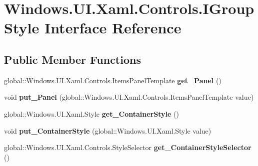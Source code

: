 \hypertarget{interface_windows_1_1_u_i_1_1_xaml_1_1_controls_1_1_i_group_style}{}\section{Windows.\+U\+I.\+Xaml.\+Controls.\+I\+Group\+Style Interface Reference}
\label{interface_windows_1_1_u_i_1_1_xaml_1_1_controls_1_1_i_group_style}
\subsection*{Public Member Functions}
\begin{DoxyCompactItemize}
\item 
\mbox{\label{interface_windows_1_1_u_i_1_1_xaml_1_1_controls_1_1_i_group_style_a0c9c3cde89c2eb82c05931ac6a601a16}} 
global\+::\+Windows.\+U\+I.\+Xaml.\+Controls.\+Items\+Panel\+Template {\bfseries get\+\_\+\+Panel} ()
\item 
\mbox{\label{interface_windows_1_1_u_i_1_1_xaml_1_1_controls_1_1_i_group_style_a54431a2fb424c8ee66764a90f1eb3a72}} 
void {\bfseries put\+\_\+\+Panel} (global\+::\+Windows.\+U\+I.\+Xaml.\+Controls.\+Items\+Panel\+Template value)
\item 
\mbox{\label{interface_windows_1_1_u_i_1_1_xaml_1_1_controls_1_1_i_group_style_af3ec155955e17dff84857535074042f7}} 
global\+::\+Windows.\+U\+I.\+Xaml.\+Style {\bfseries get\+\_\+\+Container\+Style} ()
\item 
\mbox{\label{interface_windows_1_1_u_i_1_1_xaml_1_1_controls_1_1_i_group_style_af0d3f03b233d17bef1f3a1cf829ca1b7}} 
void {\bfseries put\+\_\+\+Container\+Style} (global\+::\+Windows.\+U\+I.\+Xaml.\+Style value)
\item 
\mbox{\label{interface_windows_1_1_u_i_1_1_xaml_1_1_controls_1_1_i_group_style_a56b3461ac75ac985ef5d7d81a6c6a9cf}} 
global\+::\+Windows.\+U\+I.\+Xaml.\+Controls.\+Style\+Selector {\bfseries get\+\_\+\+Container\+Style\+Selector} ()

\end{DoxyCompactItemize}
